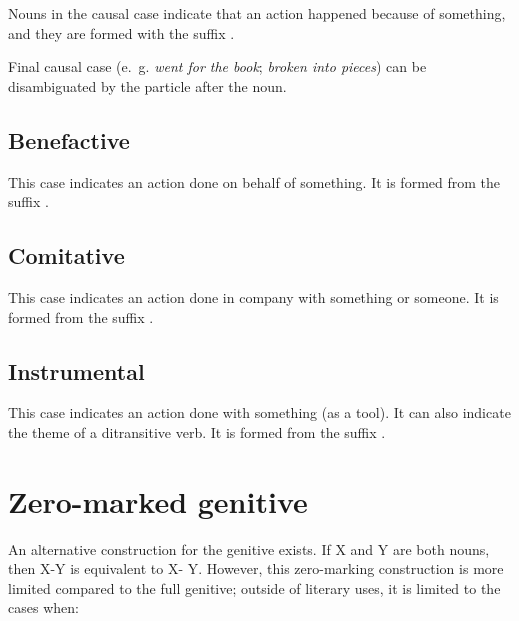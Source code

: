 \documentclass{book}
\begin{document}
Nouns in the causal case indicate that an action happened because of something, and they are formed with the suffix .

Final causal case (e.~g. \emph{went for the book}; \emph{broken into pieces}) can be disambiguated by the particle  after the noun.

\subsection{Benefactive}

This case indicates an action done on behalf of something. It is formed from the suffix .

\subsection{Comitative}

This case indicates an action done in company with something or someone. It is formed from the suffix .

\subsection{Instrumental}

This case indicates an action done with something (as a tool). It can also indicate the theme of a ditransitive verb. It is formed from the suffix .

\section{Zero-marked genitive}

An alternative construction for the genitive exists. If X and Y are both nouns, then X-Y is equivalent to X- Y. However, this zero-marking construction is more limited compared to the full genitive; outside of literary uses, it is limited to the cases when:
\end{document}
